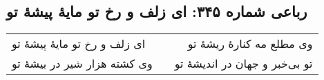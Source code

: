 \begin{center}
\section*{رباعی شماره ۳۴۵: ای زلف و رخ تو مایهٔ پیشهٔ تو}
\label{sec:sh345}
\begin{longtable}{l p{0.5cm} r}
ای زلف و رخ تو مایهٔ پیشهٔ تو
&&
وی مطلع مه کنارهٔ ریشهٔ تو
\\
وی کشته هزار شیر در بیشهٔ تو
&&
تو بی‌خبر و جهان در اندیشهٔ تو
\\
\end{longtable}
\end{center}
